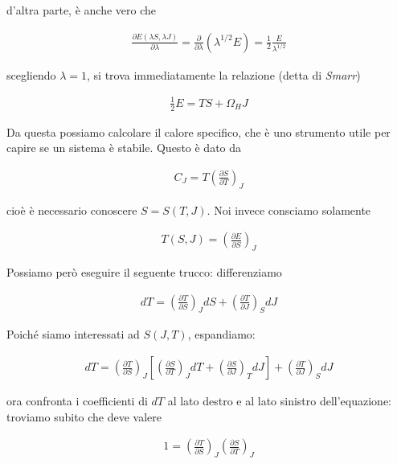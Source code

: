 \documentclass{report}
\begin{document}
d'altra parte, è anche vero che 

\begin{align}
    \frac{\partial E(\lambda S, \lambda J)}{\partial \lambda} = \frac{\partial }{\partial \lambda} (\lambda^{1/2}E) = \frac{1}{2}\frac{E}{\lambda^{1/2}}
\end{align}

scegliendo \(\lambda = 1\), si trova immediatamente la relazione (detta di \emph{Smarr})

\begin{align}
    \frac{1}{2}E = TS + \Omega_H J
\end{align}

Da questa possiamo calcolare il calore specifico, che è uno strumento utile per capire se un sistema è stabile. Questo è dato da

\begin{align}
    C_J = T \left(\frac{\partial S}{\partial T}\right)_J
\end{align}

cioè è necessario conoscere \(S = S(T, J)\). Noi invece consciamo solamente 

\begin{align}
    T(S, J) = \left(\frac{\partial E}{\partial S}\right)_J 
\end{align}

Possiamo però eseguire il seguente trucco: differenziamo 

\begin{align}
    dT = \left(\frac{\partial T}{\partial S}\right)_J dS + \left(\frac{\partial T}{\partial J}\right)_S dJ
\end{align}

Poiché siamo interessati ad \(S(J, T)\), espandiamo: 

\begin{align}
    dT = \left(\frac{\partial T}{\partial S}\right)_J \left[\left(\frac{\partial S}{\partial T}\right)_J dT + \left(\frac{\partial S}{\partial J}\right)_T dJ \right] + \left(\frac{\partial T}{\partial J}\right)_S dJ
\end{align}

ora confronta i coefficienti di \(dT\) al lato destro e al lato sinistro dell'equazione: troviamo subito che deve valere 

\begin{align}
    1 = \left(\frac{\partial T}{\partial S} \right)_J \left(\frac{\partial S}{\partial T} \right)_J
\end{align}
\end{document}
